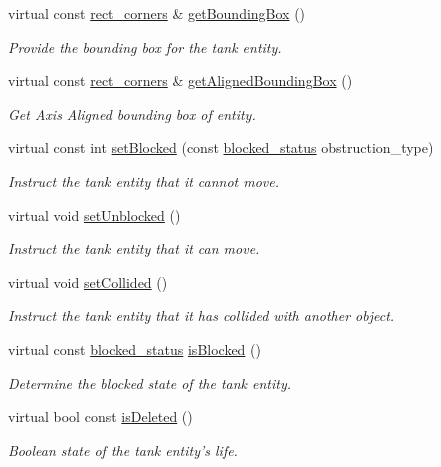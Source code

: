 \begin{DoxyCompactItemize}
virtual const \hyperlink{structrect__corners}{rect\-\_\-corners} \& \hyperlink{classTank_aeed31f7dcffb3209928a6774c9ec2a16}{get\-Bounding\-Box} ()
\begin{DoxyCompactList}\small\item\em Provide the bounding box for the tank entity. \end{DoxyCompactList}\item 
virtual const \hyperlink{structrect__corners}{rect\-\_\-corners} \& \hyperlink{classTank_acacf07f1695303387f1f6b52fd2e2abb}{get\-Aligned\-Bounding\-Box} ()
\begin{DoxyCompactList}\small\item\em Get Axis Aligned bounding box of entity. \end{DoxyCompactList}\item 
virtual const int \hyperlink{classTank_a7bedf67f1ae11382f84a3784d9324e60}{set\-Blocked} (const \hyperlink{Structures_8h_a6fef29d9424addfa69bdd2a379424896}{blocked\-\_\-status} obstruction\-\_\-type)
\begin{DoxyCompactList}\small\item\em Instruct the tank entity that it cannot move. \end{DoxyCompactList}\item 
virtual void \hyperlink{classTank_a5cbdf86621634b0c698edc5abe1a6d5b}{set\-Unblocked} ()
\begin{DoxyCompactList}\small\item\em Instruct the tank entity that it can move. \end{DoxyCompactList}\item 
virtual void \hyperlink{classTank_a6e06f183cb856f201a7e5790b852f6a6}{set\-Collided} ()
\begin{DoxyCompactList}\small\item\em Instruct the tank entity that it has collided with another object. \end{DoxyCompactList}\item 
virtual const \hyperlink{Structures_8h_a6fef29d9424addfa69bdd2a379424896}{blocked\-\_\-status} \hyperlink{classTank_a6ca225d5f7a4c3b835da4a157b86c692}{is\-Blocked} ()
\begin{DoxyCompactList}\small\item\em Determine the blocked state of the tank entity. \end{DoxyCompactList}\item 
virtual bool const \hyperlink{classTank_a33a62b283cdaf362415fad768d2f6df3}{is\-Deleted} ()
\begin{DoxyCompactList}\small\item\em Boolean state of the tank entity's life. \end{DoxyCompactList}\item 

\end{DoxyCompactItemize}
